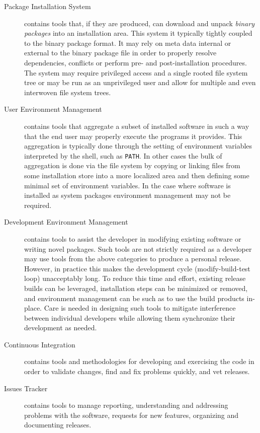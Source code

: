 \begin{description}
\item[Package Installation System] contains tools that, if they are
  produced, can download and unpack \textit{binary packages} into an
  installation area.  This system it typically tightly coupled to the
  binary package format.  It may rely on meta data internal or
  external to the binary package file in order to properly resolve
  dependencies, conflicts or perform pre- and post-installation
  procedures.  The system may require privileged access and a single
  rooted file system tree or may be run as an unprivileged user and
  allow for multiple and even interwoven file system trees.

\item[User Environment Management] contains tools that aggregate a
  subset of installed software in such a way that the end user may
  properly execute the programs it provides.  This aggregation is
  typically done through the setting of environment variables
  interpreted by the shell, such as \texttt{PATH}.  In other cases the
  bulk of aggregation is done via the file system by copying or
  linking files from some installation store into a more localized
  area and then defining some minimal set of environment variables.
  In the case where software is installed as system packages 
  environment management may not be required.

\item[Development Environment Management] contains tools to assist the
  developer in modifying existing software or writing novel packages.
  Such tools are not strictly required as a developer may use tools
  from the above categories to produce a personal release.  However,
  in practice this makes the development cycle (modify-build-test
  loop) unacceptably long.  To reduce this time and effort, existing
  release builds can be leveraged, installation steps can be minimized
  or removed, and environment management can be such as to use the
  build products in-place.  Care is needed in designing such tools to
  mitigate interference between individual developers while allowing
  them synchronize their development as needed.

\item[Continuous Integration] contains tools and methodologies for
  developing and exercising the code in order to validate changes,
  find and fix problems quickly, and vet releases.

\item[Issues Tracker] contains tools to manage reporting,
  understanding and addressing problems with the software, requests
  for new features, organizing and documenting releases.


\end{description}

